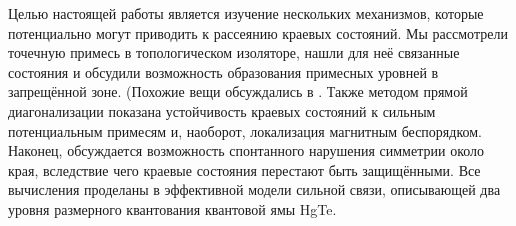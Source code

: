     Целью настоящей работы является изучение нескольких механизмов, которые
    потенциально могут приводить к рассеянию краевых состояний. Мы рассмотрели 
    точечную примесь в топологическом изоляторе, нашли для неё связанные состояния 
    и обсудили возможность образования примесных уровней в запрещённой зоне. 
    (Похожие вещи обсуждались в \cite{Lu2011}. Также 
    методом прямой диагонализации показана устойчивость краевых состояний к сильным
    потенциальным примесям и, наоборот, локализация магнитным беспорядком. Наконец, 
    обсуждается возможность спонтанного нарушения симметрии около края, вследствие чего
    краевые состояния перестают быть защищёнными. Все вычисления проделаны в эффективной
    модели сильной связи, описывающей два уровня размерного квантования квантовой ямы
    HgTe. 
    

    


    
